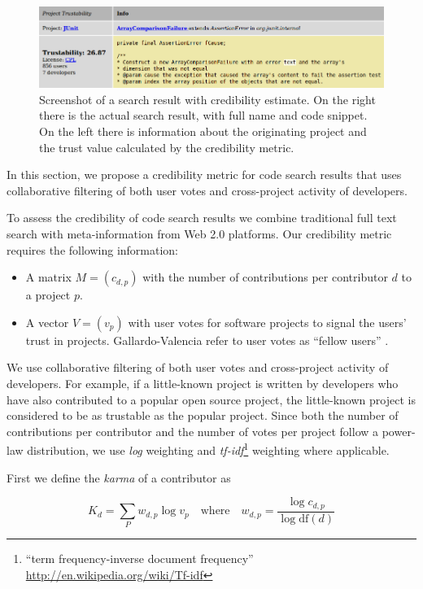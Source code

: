 \begin{figure}
  \centering
  	 \includegraphics[width=\linewidth]{bender-screenshot}
    \caption{
    {\small
    Screenshot of a \Jbd search result with credibility estimate. On the right there is the actual search result, with full name and code snippet. On the left there is information about the originating project and the trust value calculated by the credibility metric.
    }
    }
    \label{fig:screenshot}
\end{figure}

In this section, we propose a credibility metric for code search results that uses collaborative filtering of both user votes and cross-project activity of developers.

To assess the credibility of code search results we combine traditional full text search with meta-information from Web 2.0 platforms. Our credibility metric requires the following information:

\begin{itemize}
\item A matrix $M = (c_{d,p})$ with the number of contributions per contributor $d$ to a project $p$.
\item A vector $V = (v_p)$ with user votes for software projects to signal the users' trust in projects. Gallardo-Valencia \etal refer to user votes as ``fellow users'' \cite{Gall09a}.
\end{itemize}

We use collaborative filtering of both user votes and cross-project activity of developers. For example, if a little-known project is written by developers who have also contributed to a popular open source project, the little-known project is considered to be as trustable as the popular project. Since both the number of contributions per contributor and the number of votes per project follow a power-law distribution, we use \emph{log} weighting and \emph{tf-idf}\footnote{``term frequency-inverse document frequency'' \url{http://en.wikipedia.org/wiki/Tf-idf}} weighting where applicable. 

First we define the \emph{karma} of a contributor as

    $$K_{d} = \sum_{P} w_{d,p} \log v_p
    \quad \mathrm{where} \quad 
    w_{d,p} = \frac{\log c_{d,p}}{\log \mathrm{df}(d)}$$

